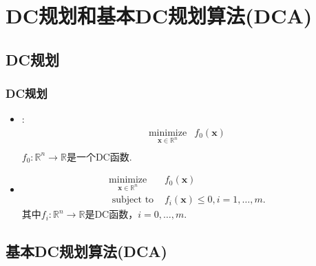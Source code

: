 \documentclass{beamer}
\begin{document}
\section{DC规划和基本DC规划算法(DCA)}

\subsection{DC规划}
\begin{frame}
\frametitle{DC规划}

\begin{itemize}
  \item
   :
$$
\begin{array}{ll}
\underset{\mathbf{x} \in \mathbb{R}^{n}}{\operatorname{minimize}} & f_{0}(\mathbf{x}) \\
\end{array}
$$
$f_{0}: \mathbb{R}^{n} \rightarrow \mathbb{R}$是一个DC函数.


\item {}
$$
\begin{array}{ll}
\underset{\mathbf{x} \in \mathbb{R}^{n}}{\operatorname{minimize}} & f_{0}(\mathbf{x}) \\
\text { subject to } & f_{i}(\mathbf{x}) \leq 0, i=1, \ldots, m .
\end{array}
$$
其中$f_{i}: \mathbb{R}^{n} \rightarrow \mathbb{R}$是DC函数，$i=0, \ldots, m$.



\end{itemize}

\end{frame}


\subsection{基本DC规划算法(DCA)}
\end{document}
